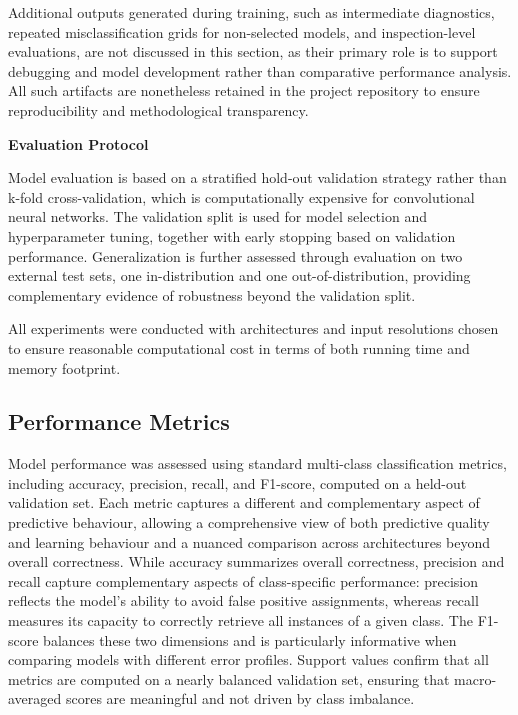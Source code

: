 \documentclass{article}
\begin{document}
Additional outputs generated during training, such as intermediate
diagnostics, repeated misclassification grids for non-selected models,
and inspection-level evaluations, are not discussed in this section, as
their primary role is to support debugging and model development rather
than comparative performance analysis. All such artifacts are
nonetheless retained in the project repository to ensure reproducibility
and methodological transparency.

\bigskip
\textbf{Evaluation Protocol}

Model evaluation is based on a stratified hold-out validation strategy
rather than k-fold cross-validation, which is computationally expensive
for convolutional neural networks. The validation split is used for
model selection and hyperparameter tuning, together with early stopping
based on validation performance. Generalization is further assessed
through evaluation on two external test sets, one in-distribution and
one out-of-distribution, providing complementary evidence of robustness
beyond the validation split.

All experiments were conducted with architectures and input resolutions
chosen to ensure reasonable computational cost in terms of both running
time and memory footprint.


\subsection{Performance Metrics}

Model performance was assessed using standard multi-class classification
metrics, including accuracy, precision, recall, and F1-score, computed
on a held-out validation set. Each metric captures a different and
complementary aspect of predictive behaviour, allowing a comprehensive
view of both predictive quality and learning behaviour and a nuanced
comparison across architectures beyond overall correctness. While
accuracy summarizes overall correctness, precision and recall capture
complementary aspects of class-specific performance: precision reflects
the model's ability to avoid false positive assignments, whereas recall
measures its capacity to correctly retrieve all instances of a given
class. The F1-score balances these two dimensions and is particularly
informative when comparing models with different error profiles. Support
values confirm that all metrics are computed on a nearly balanced
validation set, ensuring that macro-averaged scores are meaningful and
not driven by class imbalance.
\end{document}
